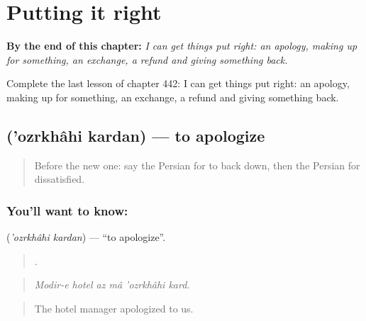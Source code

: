 
\chapter{Putting it right}
\label{ch:fa-putting-it-right}

\begin{chapteropening}
\textbf{By the end of this chapter:} \emph{I can get things put right: an apology, making up for something, an exchange, a refund and giving something back.}

Complete the last lesson of chapter 442: I can get things put right: an apology, making up for something, an exchange, a refund and giving something back.
\end{chapteropening}

\section[\texorpdfstring{\fa{عذرخواهی} \fa{کردن} ('ozrkhâhi kardan)}{عذرخواهی کردن ('ozrkhâhi kardan)}]{  ('ozrkhâhi kardan) — to apologize}

\label{lesson:FA-C442-ozrkhahi-kardan}



\begin{quote}
Before the new one: say the Persian for to back down, then the Persian for dissatisfied.
\end{quote}

\subsection*{You'll want to know:  }
\textbf{ } (\emph{'ozrkhâhi kardan}) — \textquotedblleft{}to apologize\textquotedblright{}.

\begin{quote}
     .
\end{quote}

\begin{quote}
\emph{Modir-e hotel az mâ 'ozrkhâhi kard.}
\end{quote}

\begin{quote}
The hotel manager apologized to us.
\end{quote}

